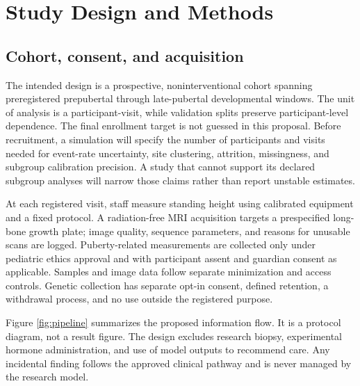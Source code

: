 \documentclass[conference]{IEEEtran}
\begin{document}
\section{Study Design and Methods}

\subsection{Cohort, consent, and acquisition}

The intended design is a prospective, noninterventional cohort spanning preregistered prepubertal through late-pubertal developmental windows. The unit of analysis is a participant-visit, while validation splits preserve participant-level dependence. The final enrollment target is not guessed in this proposal. Before recruitment, a simulation will specify the number of participants and visits needed for event-rate uncertainty, site clustering, attrition, missingness, and subgroup calibration precision. A study that cannot support its declared subgroup analyses will narrow those claims rather than report unstable estimates.

At each registered visit, staff measure standing height using calibrated equipment and a fixed protocol. A radiation-free MRI acquisition targets a prespecified long-bone growth plate; image quality, sequence parameters, and reasons for unusable scans are logged. Puberty-related measurements are collected only under pediatric ethics approval and with participant assent and guardian consent as applicable. Samples and image data follow separate minimization and access controls. Genetic collection has separate opt-in consent, defined retention, a withdrawal process, and no use outside the registered purpose.

Figure \ref{fig:pipeline} summarizes the proposed information flow. It is a protocol diagram, not a result figure. The design excludes research biopsy, experimental hormone administration, and use of model outputs to recommend care. Any incidental finding follows the approved clinical pathway and is never managed by the research model.
\end{document}
